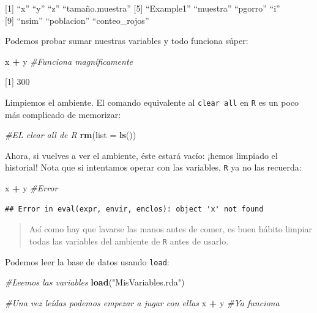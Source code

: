\documentclass[
]{book}
\newenvironment{Shaded}{\begin{snugshade}}{\end{snugshade}}
\newcommand{\CommentTok}[1]{\textcolor[rgb]{0.56,0.35,0.01}{\textit{#1}}}
\newcommand{\DataTypeTok}[1]{\textcolor[rgb]{0.13,0.29,0.53}{#1}}
\newcommand{\KeywordTok}[1]{\textcolor[rgb]{0.13,0.29,0.53}{\textbf{#1}}}
\newcommand{\NormalTok}[1]{#1}
\newcommand{\OperatorTok}[1]{\textcolor[rgb]{0.81,0.36,0.00}{\textbf{#1}}}
\newcommand{\StringTok}[1]{\textcolor[rgb]{0.31,0.60,0.02}{#1}}
\begin{document}
{[}1{]} ``x'' ``y'' ``z'' ``tamaño.muestra''
{[}5{]} ``Example1'' ``muestra'' ``pgorro'' ``i''\\
{[}9{]} ``nsim'' ``poblacion'' ``conteo\_rojos''

Podemos probar sumar nuestras variables y todo funciona súper:

\begin{Shaded}
\begin{Highlighting}[]
\NormalTok{x }\OperatorTok{+}\StringTok{ }\NormalTok{y }\CommentTok{#Funciona magníficamente}
\end{Highlighting}
\end{Shaded}

{[}1{]} 300

Limpiemos el ambiente. El comando equivalente al \texttt{clear\ all} en \texttt{R} es un poco más complicado de memorizar:

\begin{Shaded}
\begin{Highlighting}[]
\CommentTok{#EL clear all de R}
\KeywordTok{rm}\NormalTok{(}\DataTypeTok{list =} \KeywordTok{ls}\NormalTok{())}
\end{Highlighting}
\end{Shaded}

Ahora, si vuelves a ver el ambiente, éste estará vacío: ¡hemos limpiado el historial! Nota que si intentamos operar con las variables, \texttt{R} ya no las recuerda:

\begin{Shaded}
\begin{Highlighting}[]
\NormalTok{x }\OperatorTok{+}\StringTok{ }\NormalTok{y }\CommentTok{#Error}
\end{Highlighting}
\end{Shaded}

\begin{verbatim}
## Error in eval(expr, envir, enclos): object 'x' not found
\end{verbatim}

\begin{quote}
Así como hay que lavarse las manos antes de comer, es buen hábito limpiar todas las variables del ambiente de \texttt{R} antes de usarlo.
\end{quote}

Podemos leer la base de datos usando \texttt{load}:

\begin{Shaded}
\begin{Highlighting}[]
\CommentTok{#Leemos las variables}
\KeywordTok{load}\NormalTok{(}\StringTok{"MisVariables.rda"}\NormalTok{)}

\CommentTok{#Una vez leídas podemos empezar a jugar con ellas}
\NormalTok{x }\OperatorTok{+}\StringTok{ }\NormalTok{y }\CommentTok{#Ya funciona}
\end{Highlighting}
\end{Shaded}
\end{document}

